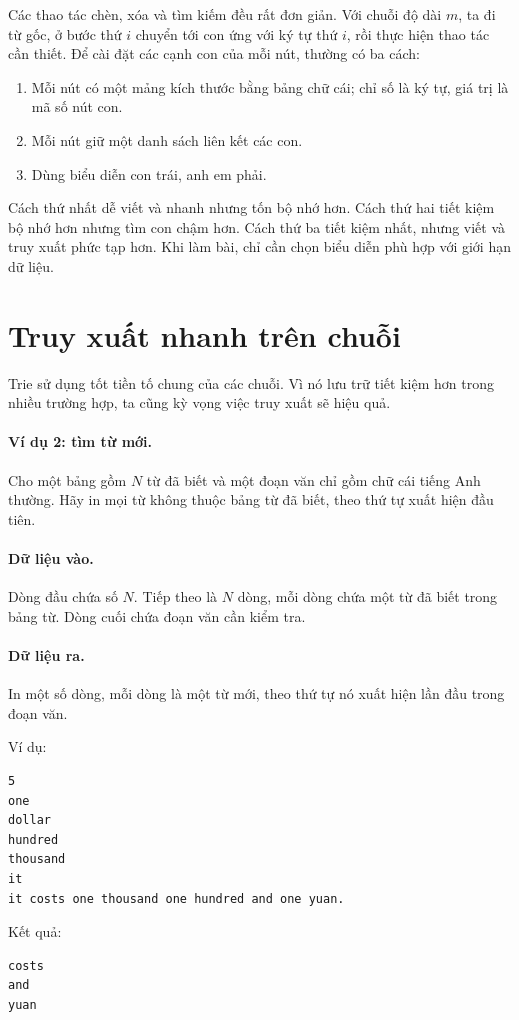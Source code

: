 \documentclass[11pt]{article}
\begin{document}
Các thao tác chèn, xóa và tìm kiếm đều rất đơn giản. Với chuỗi độ dài \(m\),
ta đi từ gốc, ở bước thứ \(i\) chuyển tới con ứng với ký tự thứ \(i\), rồi
thực hiện thao tác cần thiết. Để cài đặt các cạnh con của mỗi nút, thường có
ba cách:
\begin{enumerate}
  \item Mỗi nút có một mảng kích thước bằng bảng chữ cái; chỉ số là ký tự, giá
  trị là mã số nút con.
  \item Mỗi nút giữ một danh sách liên kết các con.
  \item Dùng biểu diễn con trái, anh em phải.
\end{enumerate}
Cách thứ nhất dễ viết và nhanh nhưng tốn bộ nhớ hơn. Cách thứ hai tiết kiệm
bộ nhớ hơn nhưng tìm con chậm hơn. Cách thứ ba tiết kiệm nhất, nhưng viết và
truy xuất phức tạp hơn. Khi làm bài, chỉ cần chọn biểu diễn phù hợp với giới
hạn dữ liệu.

\section{Truy xuất nhanh trên chuỗi}

Trie sử dụng tốt tiền tố chung của các chuỗi. Vì nó lưu trữ tiết kiệm hơn
trong nhiều trường hợp, ta cũng kỳ vọng việc truy xuất sẽ hiệu quả.

\paragraph{Ví dụ 2: tìm từ mới.}
Cho một bảng gồm \(N\) từ đã biết và một đoạn văn chỉ gồm chữ cái tiếng Anh
thường. Hãy in mọi từ không thuộc bảng từ đã biết, theo thứ tự xuất hiện đầu
tiên.

\paragraph{Dữ liệu vào.}
Dòng đầu chứa số \(N\). Tiếp theo là \(N\) dòng, mỗi dòng chứa một từ đã biết
trong bảng từ. Dòng cuối chứa đoạn văn cần kiểm tra.

\paragraph{Dữ liệu ra.}
In một số dòng, mỗi dòng là một từ mới, theo thứ tự nó xuất hiện lần đầu trong
đoạn văn.

Ví dụ:
\begin{verbatim}
5
one
dollar
hundred
thousand
it
it costs one thousand one hundred and one yuan.
\end{verbatim}
Kết quả:
\begin{verbatim}
costs
and
yuan
\end{verbatim}
\end{document}
